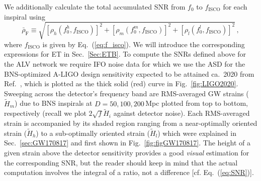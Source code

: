 \documentclass[prd,amsmath,amssymb,aps,floats,amsfonts,notitlepage,superscriptaddress,eqsecnum,nofootinbib,10pt]{revtex4-1}
\newcommand{\be}{\begin{equation}}
\newcommand{\ee}{\end{equation}}
\begin{document}
%
%
We additionally calculate 
the total accumulated SNR from $f_0$ to $f_\text{ISCO}$ for each inspiral using%
\be
\bar{\rho}_\text{F}\equiv\sqrt{\left[{\rho}_h(f_0^h,{f}_\text{ISCO})\right]^2+\left[{\rho}_m(f_0^m,{f}_\text{ISCO})\right]^2+\left[{\rho}_l(f_0^l,{f}_\text{ISCO})\right]^2} \label{eq:SNR_bar_FINAL}\, ,
\ee
%
%
where $f_\text{ISCO}$ is given by Eq.~(\ref{eq:f_isco}).
We will introduce the corresponding expressions for ET in Sec.~\ref{Sec:ETB}.
To compute the SNRs defined above for the ALV network we require IFO noise data for which
we use the ASD for the BNS-optimized A-LIGO design sensitivity expected to be attained ca.~2020 from Ref.~\cite{LIGO2020},
which is plotted as the thick solid (red) curve in Fig.~\ref{fig:LIGO2020}.
Sweeping across the detector's frequency band are RMS-averaged GW strains ($\tilde{H}_m$) due to BNS inspirals at $D=50,100,200\,$Mpc plotted from top to bottom, respectively (recall we plot $2\sqrt{f}\tilde{H}_i$ against detector noise).
Each RMS-averaged strain is accompanied by its shaded region ranging from a near-optimally oriented strain ($\tilde{H}_h$) to a sub-optimally oriented strain ($\tilde{H}_l$) which were explained in Sec.~\ref{sec:GW170817} and first shown in Fig.~\ref{fig:figGW170817}.
The height of a given strain above the detector sensitivity provides a good \emph{visual} estimation for the corresponding SNR,
but the reader should keep in mind that the actual computation involves the integral of a ratio, not a difference [cf. Eq.~(\ref{eq:SNR})].
%
%
%
\end{document}
